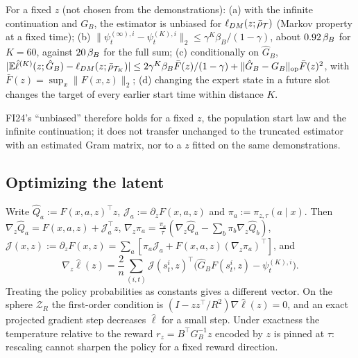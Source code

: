 \begin{proposition}\label{prop:m-dm-est}
For a fixed $z$ (not chosen from the demonstrations):
(a) with the infinite continuation and $G_B$, the estimator is unbiased for $\ell_{DM}(z;\bar\rho_{\cT})$ (Markov property at a fixed time);
(b) $\lVert\psi^{(\infty),i}_t-\psi^{(K),i}_t\rVert_2\le\gamma^K\beta_B/(1-\gamma)$, about $\vn{const.gK_over}{0.92}\,\beta_B$ for $K=60$, against $\vn{const.mass}{20}\,\beta_B$ for the full sum;
(c) conditionally on $\hat G_B$, $\lvert\E\hat\ell^{(K)}(z;\hat G_B)-\ell_{DM}(z;\bar\rho_{\cT_K})\rvert\le2\gamma^K\beta_B\bar F(z)/(1-\gamma)+\lVert\hat G_B-G_B\rVert_{\mathrm{op}}\bar F(z)^2$, with $\bar F(z)=\sup_x\lVert F(x,z)\rVert_2$;
(d) changing the expert state in a future slot changes the target of every earlier start time within distance $K$.
\end{proposition}

FI24's ``unbiased'' therefore holds for a fixed $z$, the population start law and the infinite continuation; it does not transfer unchanged to the truncated estimator with an estimated Gram matrix, nor to a $z$ fitted on the same demonstrations.

\subsection{Optimizing the latent}

\begin{proposition}\label{prop:m-dm-grad}
Write $\hat Q_a:=F(x,a,z)^\top z$, $\mathcal J_a:=\partial_zF(x,a,z)$ and $\pi_a:=\pi_{z,\tau}(a\mid x)$. Then $\nabla_z\hat Q_a=F(x,a,z)+\mathcal J_a^\top z$, $\nabla_z\pi_a=\frac{\pi_a}\tau(\nabla_z\hat Q_a-\sum_b\pi_b\nabla_z\hat Q_b)$, $\mathcal J(x,z):=\partial_zF(x,z)=\sum_a[\pi_a\mathcal J_a+F(x,a,z)(\nabla_z\pi_a)^\top]$, and
\[
\nabla_z\hat\ell(z)=\frac2n\sum_{(i,t)}\mathcal J(s^i_t,z)^\top\big(\hat G_BF(s^i_t,z)-\psi^{(K),i}_t\big).
\]
Treating the policy probabilities as constants gives a different vector. On the sphere $\mathcal Z_R$ the first-order condition is $(I-zz^\top/R^2)\nabla\hat\ell(z)=0$, and an exact projected gradient step decreases $\hat\ell$ for a small step. Under exactness the temperature relative to the reward $r_z=B^\top G_B^{-1}z$ encoded by $z$ is pinned at $\tau$: rescaling cannot sharpen the policy for a fixed reward direction.
\end{proposition}

